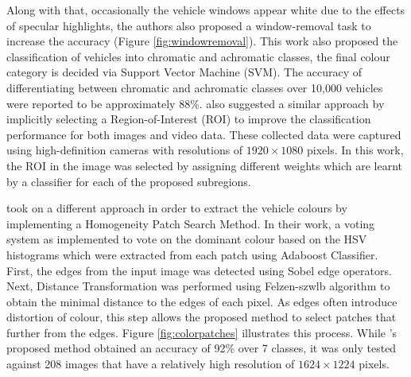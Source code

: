 Along with that, occasionally the vehicle windows appear white due to the effects of specular highlights, the authors also proposed a window-removal task to increase the accuracy (Figure \ref{fig:windowremoval}). This work also proposed the classification of vehicles into chromatic and achromatic classes, the final colour category is decided via Support Vector Machine (SVM). The accuracy of differentiating between chromatic and achromatic classes over 10,000 vehicles were reported to be approximately 88\%.  also suggested a similar approach by implicitly selecting a Region-of-Interest (ROI) to improve the classification performance for both images and video data. These collected data were captured using high-definition cameras with resolutions of $1920 \times 1080$ pixels. In this work, the ROI in the image was selected by assigning different weights which are learnt by a classifier for each of the proposed subregions. 

 took on a different approach in order to extract the vehicle colours by implementing a Homogeneity Patch Search Method. In their work, a voting system as implemented to vote on the dominant colour based on the HSV histograms which were extracted from each patch using Adaboost Classifier. First, the edges from the input image was detected using Sobel edge operators. Next, Distance Transformation was performed using Felzen-szwlb algorithm to obtain the minimal distance to the edges of each pixel. As edges often introduce distortion of colour, this step allows the proposed method to select patches that further from the edges. Figure \ref{fig:colorpatches} illustrates this process. While 's proposed method obtained an accuracy of 92\% over 7 classes, it was only tested against 208 images that have a relatively high resolution of $1624 \times 1224$ pixels.


